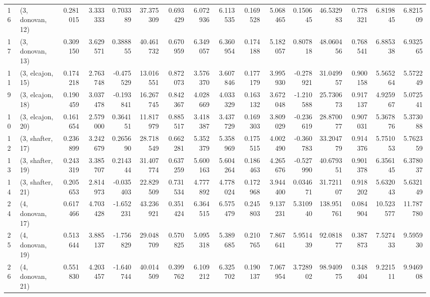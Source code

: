 \begin{tabular}{llrrrrrrrrrrrrrr}
16 &  (3, donovan, 12) &   0.281015 &  3.333333 &  0.703389 &  37.375309 &  0.693429 &   6.072936 &  6.113535 &  0.169528 &  5.068465 &  0.150645 &   46.532983 &  0.778321 &   6.819845 &   6.821509 \\
17 &  (3, donovan, 13) &   0.309150 &  3.629571 &  0.388855 &  40.461732 &  0.670959 &   6.349057 &  6.360954 &  0.174188 &  5.182057 &  0.807818 &   48.060456 &  0.768541 &   6.885338 &   6.932565 \\
11 &  (3, elcajon, 15) &   0.174218 &  2.763748 & -0.475529 &  13.016551 &  0.872073 &   3.576370 &  3.607846 &  0.177179 &  3.995930 & -0.278921 &   31.049957 &  0.900158 &   5.565264 &   5.572249 \\
9  &  (3, elcajon, 18) &   0.190459 &  3.037478 & -0.193841 &  16.267745 &  0.842367 &   4.028669 &  4.033329 &  0.163132 &  3.672048 & -1.210588 &   25.730673 &  0.917137 &   4.925967 &   5.072541 \\
10 &  (3, elcajon, 20) &   0.161654 &  2.579000 &  0.364151 &  11.817979 &  0.885517 &   3.418387 &  3.437729 &  0.169303 &  3.809029 & -0.236619 &   28.870077 &  0.907031 &   5.367876 &   5.373088 \\
12 &  (3, shafter, 17) &   0.236899 &  3.242679 &  0.265690 &  28.718549 &  0.662281 &   5.352379 &  5.358969 &  0.175515 &  4.002490 & -0.360783 &   33.204779 &  0.914376 &   5.751053 &   5.762359 \\
13 &  (3, shafter, 19) &   0.243319 &  3.385707 &  0.214344 &  31.407774 &  0.637259 &   5.600163 &  5.604264 &  0.186463 &  4.265676 & -0.527990 &   40.679351 &  0.901378 &   6.356145 &   6.378037 \\
14 &  (3, shafter, 21) &   0.205653 &  2.814973 & -0.035403 &  22.829509 &  0.731534 &   4.777892 &  4.778024 &  0.172968 &  3.944400 &  0.034671 &   31.721107 &  0.918202 &   5.632043 &   5.632149 \\
24 &  (4, donovan, 17) &   0.617466 &  4.703428 & -1.652231 &  43.236921 &  0.351424 &   6.364515 &  6.575479 &  0.245803 &  9.137231 &  5.310940 &  138.951761 &  0.084904 &  10.523577 &  11.787780 \\
25 &  (4, donovan, 19) &   0.513644 &  3.885137 & -1.756829 &  29.048709 &  0.570825 &   5.095318 &  5.389685 &  0.210765 &  7.867641 &  5.951439 &   92.081877 &  0.387873 &   7.527433 &   9.595930 \\
26 &  (4, donovan, 21) &   0.551830 &  4.203457 & -1.640744 &  40.014509 &  0.399762 &   6.109212 &  6.325702 &  0.190137 &  7.067954 &  3.728902 &   98.940975 &  0.348404 &   9.221511 &   9.946908 \\

\end{tabular}
